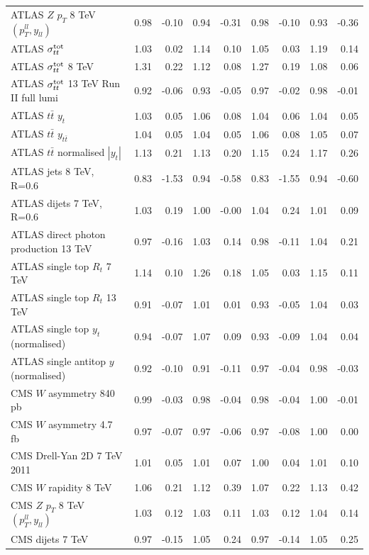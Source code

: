 \documentclass[withindex,glossary]{cam-thesis}
\begin{document}
\begin{table}[H]
\begin{tabular}{lrrrrrrrr}
ATLAS $Z$ $p_T$ 8 TeV $(p_T^{ll},y_{ll})$ & 0.98 & -0.10 & 0.94 & -0.31 & 0.98 & -0.10 & 0.93 & -0.36 \\
ATLAS $\sigma_{tt}^{\rm tot}$ & 1.03 & 0.02 & 1.14 & 0.10 & 1.05 & 0.03 & 1.19 & 0.14 \\
ATLAS $\sigma_{tt}^{\rm tot}$ 8 TeV & 1.31 & 0.22 & 1.12 & 0.08 & 1.27 & 0.19 & 1.08 & 0.06 \\
ATLAS $\sigma_{tt}^{\rm tot}$ 13 TeV Run II full lumi & 0.92 & -0.06 & 0.93 & -0.05 & 0.97 & -0.02 & 0.98 & -0.01 \\
ATLAS $t\bar{t}$ $y_t$ & 1.03 & 0.05 & 1.06 & 0.08 & 1.04 & 0.06 & 1.04 & 0.05 \\
ATLAS $t\bar{t}$ $y_{t\bar{t}}$ & 1.04 & 0.05 & 1.04 & 0.05 & 1.06 & 0.08 & 1.05 & 0.07 \\
ATLAS $t\bar{t}$ normalised $|y_t|$ & 1.13 & 0.21 & 1.13 & 0.20 & 1.15 & 0.24 & 1.17 & 0.26 \\
ATLAS jets 8 TeV, R=0.6 & 0.83 & -1.53 & 0.94 & -0.58 & 0.83 & -1.55 & 0.94 & -0.60 \\
ATLAS dijets 7 TeV, R=0.6 & 1.03 & 0.19 & 1.00 & -0.00 & 1.04 & 0.24 & 1.01 & 0.09 \\
ATLAS direct photon production 13 TeV & 0.97 & -0.16 & 1.03 & 0.14 & 0.98 & -0.11 & 1.04 & 0.21 \\
ATLAS single top $R_{t}$ 7 TeV & 1.14 & 0.10 & 1.26 & 0.18 & 1.05 & 0.03 & 1.15 & 0.11 \\
ATLAS single top $R_{t}$ 13 TeV & 0.91 & -0.07 & 1.01 & 0.01 & 0.93 & -0.05 & 1.04 & 0.03 \\
ATLAS single top $y_t$ (normalised) & 0.94 & -0.07 & 1.07 & 0.09 & 0.93 & -0.09 & 1.04 & 0.04 \\
ATLAS single antitop $y$ (normalised) & 0.92 & -0.10 & 0.91 & -0.11 & 0.97 & -0.04 & 0.98 & -0.03 \\
CMS $W$ asymmetry 840 pb & 0.99 & -0.03 & 0.98 & -0.04 & 0.98 & -0.04 & 1.00 & -0.01 \\
CMS $W$ asymmetry 4.7 fb & 0.97 & -0.07 & 0.97 & -0.06 & 0.97 & -0.08 & 1.00 & 0.00 \\
CMS Drell-Yan 2D 7 TeV 2011 & 1.01 & 0.05 & 1.01 & 0.07 & 1.00 & 0.04 & 1.01 & 0.10 \\
CMS $W$ rapidity 8 TeV & 1.06 & 0.21 & 1.12 & 0.39 & 1.07 & 0.22 & 1.13 & 0.42 \\
CMS $Z$ $p_T$ 8 TeV $(p_T^{ll},y_{ll})$ & 1.03 & 0.12 & 1.03 & 0.11 & 1.03 & 0.12 & 1.04 & 0.14 \\
CMS dijets 7 TeV & 0.97 & -0.15 & 1.05 & 0.24 & 0.97 & -0.14 & 1.05 & 0.25 \\

\end{tabular}
\end{table}
\end{document}
